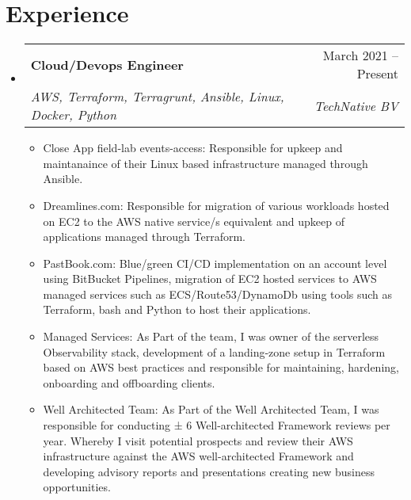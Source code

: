 \documentclass[letterpaper,11pt]{article}
\makeatletter
\newcommand{\resumeItem}[1]{
  \item\small{
    {#1 \vspace{-2pt}}
  }
}
\newcommand{\resumeSubheading}[4]{
  \vspace{-2pt}\item
    \begin{tabular*}{0.97\textwidth}[t]{l@{\extracolsep{\fill}}r}
      \textbf{#1} & #2 \\
      \textit{\small#3} & \textit{\small #4} \\
    \end{tabular*}\vspace{-7pt}
}
\newcommand{\resumeSubSubheading}[2]{
    \item
    \begin{tabular*}{0.97\textwidth}{l@{\extracolsep{\fill}}r}
      \textit{\small#1} & \textit{\small #2} \\
    \end{tabular*}\vspace{-7pt}
}
\newcommand{\resumeSubHeadingListStart}{\begin{itemize}[leftmargin=0.15in, label={}]}
\newcommand{\resumeSubHeadingListEnd}{\end{itemize}}
\newcommand{\resumeItemListStart}{\begin{itemize}}
\newcommand{\resumeItemListEnd}{\end{itemize}\vspace{-5pt}}
\makeatother
\begin{document}

\section{Experience}
  \resumeSubHeadingListStart

    \resumeSubheading
      {Cloud/Devops Engineer}{March 2021 -- Present}
      {AWS, Terraform, Terragrunt, Ansible, Linux, Docker, Python}{TechNative BV}
      \resumeItemListStart
        \resumeItem{Close App field-lab events-access: Responsible for upkeep and maintanaince of their Linux based infrastructure managed through Ansible.}{}
        \resumeItem{Dreamlines.com: Responsible for migration of various workloads hosted on EC2 to the AWS native service/s equivalent and upkeep of applications managed through Terraform.}
        \resumeItem{PastBook.com: Blue/green CI/CD implementation on an account level using BitBucket Pipelines, migration of EC2 hosted services to AWS managed services such as ECS/Route53/DynamoDb using tools such as Terraform, bash and Python to host their applications.}
        \resumeItem{Managed Services: As Part of the team, I was owner of the serverless Observability stack, development of a landing-zone setup in Terraform based on AWS best practices and responsible for maintaining, hardening, onboarding and offboarding clients.}
        \resumeItem{Well Architected Team: As Part of the Well Architected Team, I was responsible for conducting ± 6 Well-architected Framework reviews per year. Whereby I visit potential prospects and review their AWS infrastructure against the AWS well-architected Framework and developing advisory reports and presentations creating new business opportunities.}
      \resumeItemListEnd
  \resumeSubHeadingListEnd
\end{document}

